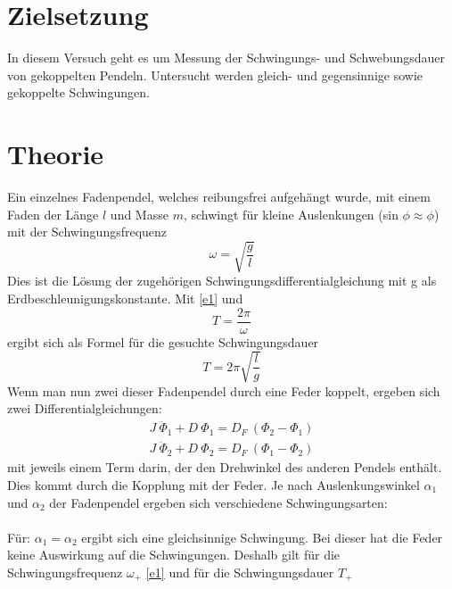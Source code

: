 \maketitle
\tableofcontents
\newpage

\section{Zielsetzung}
In diesem Versuch geht es um Messung der Schwingungs- und Schwebungsdauer von gekoppelten Pendeln.
Untersucht werden gleich- und gegensinnige sowie gekoppelte Schwingungen.
\section{Theorie}
Ein einzelnes Fadenpendel, welches reibungsfrei aufgehängt wurde, mit einem Faden der Länge $\textit{l}$ und Masse $\textit{m}$,
schwingt für kleine Auslenkungen (sin $\phi \approx \phi$) mit der Schwingungsfrequenz
\begin{equation}
  \omega = \sqrt{\frac{g}{l}}
  \label{e1}
\end{equation}
Dies ist die Lösung der zugehörigen Schwingungsdifferentialgleichung mit g als Erdbeschleunigungskonstante. Mit \eqref{e1} und
\begin{equation*}
  \textit{T} = \frac{2\pi}{\omega}
\end{equation*}
ergibt sich als Formel für die gesuchte Schwingungsdauer
\begin{equation}
  \textit{T} = 2\pi \sqrt{\frac{l}{g}}
  \label{e2}
\end{equation}
Wenn man nun zwei dieser Fadenpendel durch eine Feder koppelt, ergeben sich zwei Differentialgleichungen:
\begin{equation}
  \begin{split}
    J \ \ddot{\Phi}_1 + D \ \Phi_{1} = D_{F} \ (\Phi_{2} - \Phi_{1}) \\
    J \ \ddot{\Phi}_2 + D \ \Phi_{2} = D_{F} \ (\Phi_{1} - \Phi_{2})
  \end{split}
\end{equation}
mit jeweils einem Term darin,
der den Drehwinkel des anderen Pendels enthält. Dies kommt durch die Kopplung mit der Feder. Je nach Auslenkungswinkel $\alpha_{1}$
und $\alpha_{2}$ der Fadenpendel ergeben sich verschiedene Schwingungsarten:
\\
\\
Für: $\alpha_{1} = \alpha_{2}$ ergibt sich eine gleichsinnige Schwingung. Bei dieser hat die Feder keine Auswirkung auf die
Schwingungen. Deshalb gilt für die Schwingungsfrequenz $\omega_{+}$ \eqref{e1} und für die Schwingungsdauer $\textit{T}_{+}$

